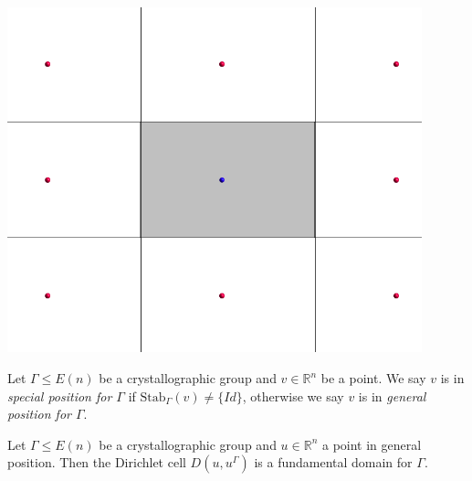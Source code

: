 \documentclass{beamer}
\theoremstyle{plain}
\newcommand\R{\mathbb R}
\newcommand{\stab}{\mathrm{Stab}}
\begin{document}
\begin{frame}
    \begin{center}
        
        \includegraphics[width=0.9\textwidth]{images/dirichlet-example.png}
    \end{center}
\end{frame}

\begin{frame}
    \begin{definition}\label{def:special-gen-pos}
        Let $\Gamma \leq E(n)$ be a crystallographic group and $v \in \R^n$ be a point.
        We say $v$ is in \emph{special position for $\Gamma$} if \pause $\stab_{\Gamma}(v) \neq \{Id\}$, \pause otherwise we say $v$ is in \emph{general position for $\Gamma$}.
    \end{definition}

    \begin{theorem}
        Let $\Gamma \leq E(n)$ be a crystallographic group and $u \in \R^n$ a point in general position. \pause
        Then the Dirichlet cell $D(u, u^\Gamma)$ is a fundamental domain for $\Gamma$.
    \end{theorem}
\end{frame}
\end{document}
